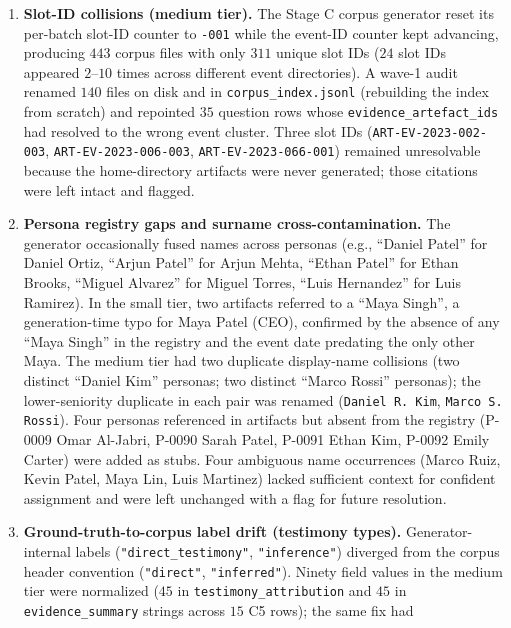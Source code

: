 \begin{enumerate}
  \item \textbf{Slot-ID collisions (medium tier).} The Stage C corpus generator
    reset its per-batch slot-ID counter to \texttt{-001} while the event-ID
    counter kept advancing, producing $443$ corpus files with only $311$ unique
    slot IDs ($24$ slot IDs appeared $2$--$10$ times across different event
    directories). A wave-1 audit renamed $140$ files on disk and in
    \texttt{corpus\_index.jsonl} (rebuilding the index from scratch) and
    repointed $35$ question rows whose \texttt{evidence\_artefact\_ids} had
    resolved to the wrong event cluster. Three slot IDs
    (\texttt{ART-EV-2023-002-003}, \texttt{ART-EV-2023-006-003},
    \texttt{ART-EV-2023-066-001}) remained unresolvable because the
    home-directory artifacts were never generated; those citations were left
    intact and flagged.
  \item \textbf{Persona registry gaps and surname cross-contamination.} The
    generator occasionally fused names across personas (e.g., ``Daniel Patel''
    for Daniel Ortiz, ``Arjun Patel'' for Arjun Mehta, ``Ethan Patel'' for Ethan
    Brooks, ``Miguel Alvarez'' for Miguel Torres, ``Luis Hernandez'' for Luis
    Ramirez). In the small tier, two artifacts referred to a ``Maya Singh'', a
    generation-time typo for Maya Patel (CEO), confirmed by the absence of any
    ``Maya Singh'' in the registry and the event date predating the only other
    Maya. The medium tier had two duplicate display-name collisions (two distinct
    ``Daniel Kim'' personas; two distinct ``Marco Rossi'' personas); the
    lower-seniority duplicate in each pair was renamed (\texttt{Daniel R. Kim},
    \texttt{Marco S. Rossi}). Four personas referenced in artifacts but absent
    from the registry (P-0009 Omar Al-Jabri, P-0090 Sarah Patel, P-0091 Ethan
    Kim, P-0092 Emily Carter) were added as stubs. Four ambiguous name
    occurrences (Marco Ruiz, Kevin Patel, Maya Lin, Luis Martinez) lacked
    sufficient context for confident assignment and were left unchanged with a
    flag for future resolution.
  \item \textbf{Ground-truth-to-corpus label drift (testimony types).}
    {\sloppy
    Generator-internal labels (\texttt{"direct\_testimony"},
    \texttt{"inference"}) diverged from the corpus header convention
    (\texttt{"direct"}, \texttt{"inferred"}). Ninety field values in the medium
    tier were normalized ($45$ in \texttt{testimony\_attribution} and $45$ in
    \texttt{evidence\_summary} strings across $15$ C5 rows); the same fix had
}
\end{enumerate}
